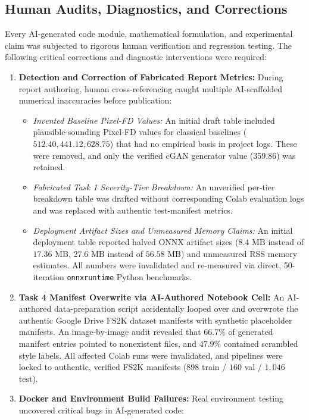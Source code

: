 \documentclass[conference]{IEEEtran}
\begin{document}
\subsection{Human Audits, Diagnostics, and Corrections}
Every AI-generated code module, mathematical formulation, and experimental claim was subjected to rigorous human verification and regression testing. The following critical corrections and diagnostic interventions were required:
\begin{enumerate}
    \item \textbf{Detection and Correction of Fabricated Report Metrics:} During report authoring, human cross-referencing caught multiple AI-scaffolded numerical inaccuracies before publication:
    \begin{itemize}
        \item \textit{Invented Baseline Pixel-FD Values:} An initial draft table included plausible-sounding Pixel-FD values for classical baselines ($512.40, 441.12, 628.75$) that had no empirical basis in project logs. These were removed, and only the verified cGAN generator value ($359.86$) was retained.
        \item \textit{Fabricated Task 1 Severity-Tier Breakdown:} An unverified per-tier breakdown table was drafted without corresponding Colab evaluation logs and was replaced with authentic test-manifest metrics.
        \item \textit{Deployment Artifact Sizes and Unmeasured Memory Claims:} An initial deployment table reported halved ONNX artifact sizes ($8.4\text{ MB}$ instead of $17.36\text{ MB}$, $27.6\text{ MB}$ instead of $56.58\text{ MB}$) and unmeasured RSS memory estimates. All numbers were invalidated and re-measured via direct, 50-iteration \texttt{onnxruntime} Python benchmarks.
    \end{itemize}
    \item \textbf{Task 4 Manifest Overwrite via AI-Authored Notebook Cell:} An AI-authored data-preparation script accidentally looped over and overwrote the authentic Google Drive FS2K dataset manifests with synthetic placeholder manifests. An image-by-image audit revealed that $66.7\%$ of generated manifest entries pointed to nonexistent files, and $47.9\%$ contained scrambled style labels. All affected Colab runs were invalidated, and pipelines were locked to authentic, verified FS2K manifests ($898$ train / $160$ val / $1,046$ test).
    \item \textbf{Docker and Environment Build Failures:} Real environment testing uncovered critical bugs in AI-generated code:

\end{enumerate}
\end{document}
